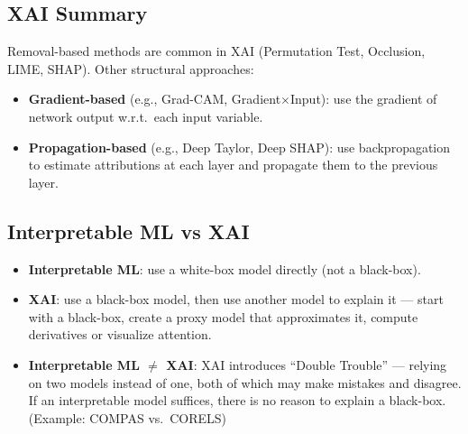 \documentclass[UTF8]{ctexart}
\begin{document}
\subsection{XAI Summary}

Removal-based methods are common in XAI (Permutation Test, Occlusion, LIME, SHAP). Other structural approaches:
\begin{itemize}
    \item \textbf{Gradient-based} (e.g., Grad-CAM, Gradient$\times$Input): use the gradient of network output w.r.t.\ each input variable.
    \item \textbf{Propagation-based} (e.g., Deep Taylor, Deep SHAP): use backpropagation to estimate attributions at each layer and propagate them to the previous layer.
\end{itemize}

\subsection{Interpretable ML vs XAI}

\begin{itemize}
    \item \textbf{Interpretable ML}: use a white-box model directly (not a black-box).
    \item \textbf{XAI}: use a black-box model, then use another model to explain it --- start with a black-box, create a proxy model that approximates it, compute derivatives or visualize attention.
    \item \textbf{Interpretable ML $\neq$ XAI}: XAI introduces ``Double Trouble'' --- relying on two models instead of one, both of which may make mistakes and disagree. If an interpretable model suffices, there is no reason to explain a black-box. (Example: COMPAS vs.\ CORELS)
\end{itemize}
\end{document}
